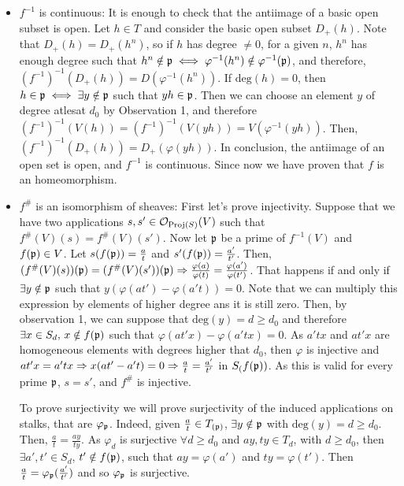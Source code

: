\begin{sol}
\begin{enumerate}[label=\alph*)]
\begin{itemize}
			\item $f^{-1}$ is continuous: It is enough to check that the antiimage of a basic open subset is open. Let $h \in T$ and consider the basic open subset $D_+(h)$. Note that $D_+(h) = D_+(h^n)$, so if $h$ has degree $\neq 0$, for a given $n$, $h^n$ has enough degree such that $h^n \notin \mathfrak{p} \iff \varphi^{-1}(h^n) \notin \varphi^{-1}(\mathfrak{p})$, and therefore, $(f^{-1})^{-1}(D_+(h)) = D(\varphi^{-1}(h^n))$. If $\mathrm{deg}(h) = 0$, then $h \in \mathfrak{p} \iff \exists y \notin \mathfrak{p}$ such that $yh \in \mathfrak{p}$. Then we can choose an element $y$ of degree atlesat $d_0$ by Observation 1, and therefore $(f^{-1})^{-1}(V(h)) = (f^{-1})^{-1}(V(yh)) = V(\varphi^{-1}(yh))$. Then, $(f^{-1})^{-1}(D_+(h)) = D_+(\varphi(yh))$. In conclusion, the antiimage of an open set is open, and $f^{-1}$ is continuous.
			Since now we have proven that $f$ is an homeomorphism. 

			\item $f^{\#}$ is an isomorphism of sheaves: First let's prove injectivity. Suppose that we have two applications $s,s' \in \mathcal{O}_{\mathrm{Proj}(S)}(V)$ such that $f^{\#}(V)(s) = f^{\#}(V)(s')$. Now let $\mathfrak{p}$ be a prime of $f^{-1}(V)$ and $f(\mathfrak{p}) \in V$. Let $s(f(\mathfrak{p})) = \frac{a}{t}$ and $s'(f(\mathfrak{p})) = \frac{a'}{t'}$. Then, $(f^{\#}(V)(s))(\mathfrak{p}) =  (f^{\#}(V)(s'))(\mathfrak{p}) \Rightarrow \frac{\varphi(a)}{\varphi(t)} = \frac{\varphi(a')}{\varphi(t')}$. That happens if and only if $\exists y \notin \mathfrak{p}$ such that $y(\varphi(at')-\varphi(a't)) = 0$. Note that we can multiply this expression by elements of higher degree ans it is still zero. Then, by observation 1, we can suppose that $\mathrm{deg}(y) = d \geq d_0$ and therefore $\exists x \in S_d, \, x \notin f(\mathfrak{p})$ such that $\varphi(at'x)-\varphi(a'tx) = 0$. As $a'tx$ and $at'x$ are homogeneous elements with degrees higher that $d_0$, then $\varphi$ is injective and $at'x = a'tx \Rightarrow x(at'-a't) = 0 \Rightarrow \frac{a}{t} = \frac{a'}{t'}$ in $S_(f(\mathfrak{p}))$. As this is valid for every prime $\mathfrak{p}$, $s = s'$, and $f^{\#}$ is injective. 

			To prove surjectivity we will prove surjectivity of the induced applications on stalks, that are $\varphi_{\mathfrak{p}}$. Indeed, given $\frac{a}{t} \in T_{(\mathfrak{p})}$, $\exists y \notin \mathfrak{p}$ with $\mathrm{deg}(y) = d \geq d_0$. Then, $\frac{a}{t} = \frac{ay}{ty}$. As $\varphi_d$ is surjective $\forall d \geq d_0$ and $ay, ty \in T_d$, with $d \geq d_0$, then $\exists a', t' \in S_d$, $t' \notin f(\mathfrak{p})$, such that $ay = \varphi(a')$ and $ty = \varphi(t')$. Then $\frac{a}{t} = \varphi_{\mathfrak{p}}(\frac{a'}{t'})$ and so $\varphi_{\mathfrak{p}}$ is surjective.
		\end{itemize}


\end{enumerate}
\end{sol}
